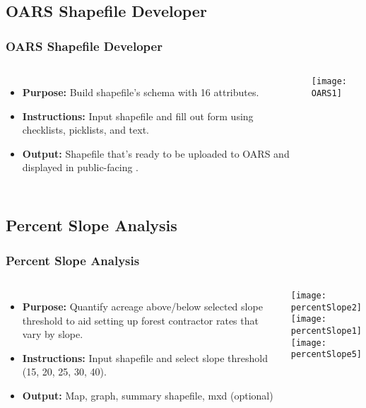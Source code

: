\documentclass[t]{beamer} %
\begin{document}

\subsection{OARS Shapefile Developer}
\begin{frame}
\frametitle{OARS Shapefile Developer}

\begin{columns}[t]
\begin{itemize}
\item\textbf{Purpose: }Build shapefile's schema with 16 attributes.\\
\item\textbf{Instructions: }Input shapefile and fill out form using checklists, picklists, and text.\\
\item\textbf{Output: }Shapefile that's ready to be uploaded to OARS and displayed in public-facing .
\end{itemize}

\texttt{[image: OARS1]}\\
\end{columns}
\end{frame}


\subsection{Percent Slope Analysis}
\begin{frame}
\frametitle{Percent Slope Analysis}

\begin{columns}[t]
\begin{itemize}
\item\textbf{Purpose: }Quantify acreage above/below selected slope threshold to aid setting up forest contractor rates that vary by slope.\\
\item\textbf{Instructions: }Input shapefile and select slope threshold (15, 20, 25, 30, 40). \\
\item\textbf{Output: }Map, graph, summary shapefile, mxd (optional)
\end{itemize}
\texttt{[image: percentSlope2]}\\

\texttt{[image: percentSlope1]}\\
\vspace{0.1in}
\texttt{[image: percentSlope5]}\\
\end{columns}
\end{frame}
\end{document}
